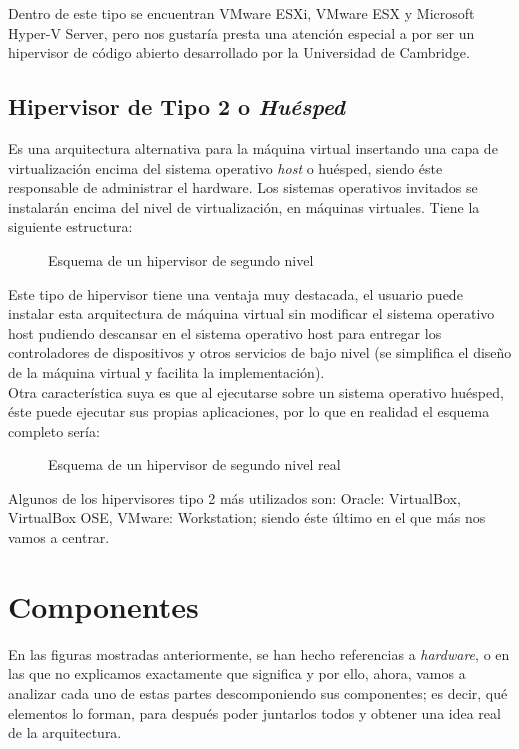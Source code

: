 Dentro de este tipo se encuentran VMware ESXi, VMware ESX y Microsoft Hyper-V Server, pero nos gustaría presta una atención especial a  por ser un hipervisor de código abierto desarrollado por la Universidad de Cambridge\cite{proyectoxen}\cite{proyectoxen2}.
\subsection{Hipervisor de Tipo 2 o \emph{Huésped}}
Es una arquitectura alternativa para la máquina virtual insertando una capa de virtualización encima del sistema operativo \emph{host} o huésped, siendo éste responsable de administrar el hardware. Los sistemas operativos invitados se instalarán encima del nivel de virtualización, en máquinas virtuales. Tiene la siguiente estructura:

\begin{figure}[H]
\begin{center}
\end{center}
\caption[Hipervisor Tipo 2]{Esquema de un hipervisor de segundo nivel}
\end{figure}

Este tipo de hipervisor tiene una ventaja muy destacada, el usuario puede instalar esta arquitectura de máquina virtual sin modificar el sistema operativo host pudiendo descansar en el sistema operativo host para entregar los controladores de dispositivos y otros servicios de bajo nivel (se simplifica el diseño de la máquina virtual y facilita la implementación).\\

Otra característica suya es que al ejecutarse sobre un sistema operativo huésped, éste puede ejecutar sus propias aplicaciones, por lo que en realidad el esquema completo sería:

\begin{figure}[H]
\begin{center}
\end{center}
\caption[Hipervisor Tipo 2 final]{Esquema de un hipervisor de segundo nivel real}
\end{figure}

Algunos de los hipervisores tipo 2 más utilizados son: Oracle: VirtualBox, VirtualBox OSE, VMware: Workstation; siendo éste último en el que más nos vamos a centrar.

\section{Componentes}
En las figuras mostradas anteriormente, se han hecho referencias a \emph{hardware}, \emph{} o \emph{} en las que no explicamos exactamente que significa y por ello, ahora, vamos a analizar cada uno de estas partes descomponiendo sus componentes; es decir, qué elementos lo forman, para después poder juntarlos todos y obtener una idea real de la arquitectura.\\

